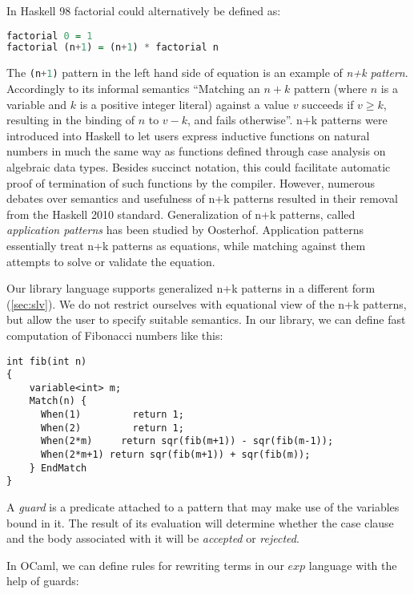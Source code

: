 \documentclass{llncs}
\DeclareRobustCommand{\codehaskell}[1]{{\lstinline[breaklines=false,language=Haskell]{#1}}}
\begin{document}
In Haskell 98\cite{Haskell98Book} factorial could alternatively be defined as:

\begin{lstlisting}[language=Haskell]
factorial 0 = 1
factorial (n+1) = (n+1) * factorial n
\end{lstlisting}

\noindent
The \codehaskell{(n+1)} pattern in the left hand side of equation is an example of 
\emph{n+k pattern}. Accordingly to its informal semantics ``Matching an $n+k$ 
pattern (where $n$ is a variable and $k$ is a positive integer literal) against 
a value $v$ succeeds if $v \ge k$, resulting in the binding of $n$ to $v-k$, and 
fails otherwise''\cite{haskell98}. n+k patterns were introduced into Haskell to 
let users express inductive functions on natural numbers in much the same way as 
functions defined through case analysis on algebraic data types. Besides 
succinct notation, this could facilitate automatic proof of 
termination of such functions by the compiler.
However, numerous debates over semantics and usefulness of n+k patterns
resulted in their removal from the Haskell 
2010 standard\cite{haskell2010}. Generalization of n+k patterns, called 
\emph{application patterns} has been studied by Oosterhof\cite{OosterhofThesis}. 
Application patterns essentially treat n+k patterns as equations, while matching 
against them attempts to solve or validate the equation.

Our library language supports generalized n+k patterns in a different form 
(\textsection\ref{sec:slv}). We do not restrict ourselves with equational view 
of the n+k patterns, but allow the user to specify suitable semantics.
In our library, we can define fast computation of Fibonacci numbers like this:

\begin{lstlisting}[keepspaces]
int fib(int n)
{
    variable<int> m;
    Match(n) {
      When(1)         return 1;     
      When(2)         return 1;
      When(2*m)     return sqr(fib(m+1)) - sqr(fib(m-1));
      When(2*m+1) return sqr(fib(m+1)) + sqr(fib(m));
    } EndMatch
}
\end{lstlisting}

\noindent
A \emph{guard} 
is a predicate attached to a pattern that may make use of the variables bound in 
it. The result of its evaluation will determine whether the case clause and the 
body associated with it will be \emph{accepted} or \emph{rejected}.

In OCaml, we can define rules for rewriting terms in 
our $exp$ language with the help of guards:
\end{document}
